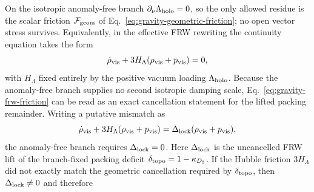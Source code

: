 \documentclass[11pt]{article}
\begin{document}
On the isotropic anomaly-free branch $\partial_{\nu}\Lambda_{\rm holo}=0$, so
the only allowed residue is the scalar friction $\mathcal F_{\rm geom}$ of
Eq.~\eqref{eq:gravity-geometric-friction}; no open vector stress survives.
Equivalently, in the effective FRW rewriting the continuity equation takes the
form
\begin{equation}
\label{eq:gravity-frw-friction}
 \dot\rho_{\rm vis}+3H_{\Lambda}(\rho_{\rm vis}+p_{\rm vis})=0,
\end{equation}
with $H_{\Lambda}$ fixed entirely by the positive vacuum loading
$\Lambda_{\rm holo}$. Because the anomaly-free branch supplies no second
isotropic damping scale, Eq.~\eqref{eq:gravity-frw-friction} can be read as an
exact cancellation statement for the lifted packing remainder. Writing a
putative mismatch as
\begin{equation}
\label{eq:gravity-frw-lock-mismatch}
 \dot\rho_{\rm vis}+3H_{\Lambda}(\rho_{\rm vis}+p_{\rm vis})
 =
 \Delta_{\rm lock}(\rho_{\rm vis}+p_{\rm vis}),
\end{equation}
the anomaly-free branch requires $\Delta_{\rm lock}=0$. Here
$\Delta_{\rm lock}$ is the uncancelled FRW lift of the branch-fixed packing
deficit $\delta_{\rm topo}=1-\kappa_{D_5}$. If the Hubble friction $3H_{\Lambda}$
did not exactly match the geometric cancellation required by
$\delta_{\rm topo}$, then $\Delta_{\rm lock}\neq0$ and therefore
\end{document}
